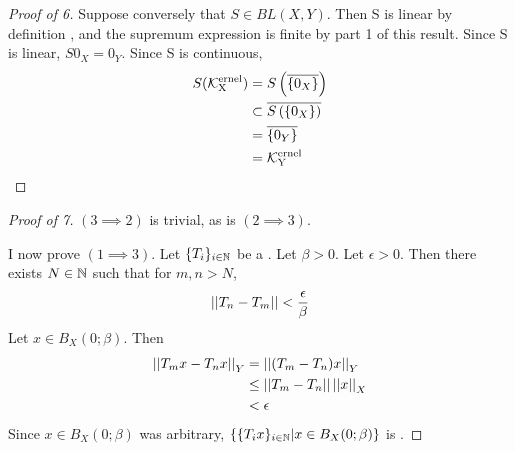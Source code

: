 \begin{prop}
\begin{proof}[Proof of 6]
    Suppose conversely that $S \in BL(X,Y)$. 
    Then S is linear by definition
    , and the supremum expression is finite by part 1 
    of this result. 
    Since S is linear, $S0_X = 0_Y$. 
    Since S is continuous, 
    \begin{align*}
        S(\bf\mathcal{K}\rm^{ernel}_X) &= S\left( \overline{\{0_X\}}\right)\\
        & \subset \overline{S\left( \{0_X\}\right)}\\
        & =\overline{\{0_Y\}} \\
        & = \bf\mathcal{K}\rm^{ernel}_Y
    \end{align*}



\end{proof}
\begin{proof}[Proof of 7]
    $(3 \implies 2)$ is trivial, as is $(2 \implies 3)$.
    
    I now prove $(1\implies 3)$. 
    Let $\{T_i\}_{i \in \mathbb{N}}$ be a 
    \PseudometricCauchySequence.
    Let $\beta > 0$. 
    Let $\epsilon > 0$. 
    Then there exists $N \in \mathbb{N}$
    such that for $m,n > N$, 
    \begin{equation*}
    \left|\left| T_n-T_m \right|\right| < \frac{\epsilon}{\beta}
    \end{equation*}
    Let $x \in B_X(0;\beta)$. 
    Then 
    \begin{align*}
        \left|\left| T_mx-T_nx \right|\right|_Y & = \left|\left| (T_m-T_n)x \right|\right|_Y\\
        & \leq \left|\left| T_m-T_n \right|\right| \left|\left| x \right|\right|_X\\
        & < \epsilon
    \end{align*}
    Since $x \in B_X(0;\beta)$ was arbitrary,
    $\{\{T_ix\}_{i \in \mathbb{N}} | x \in B_X(0;\beta)\}$ is
    \UniformlyCauchy.


\end{proof}
\end{prop}

